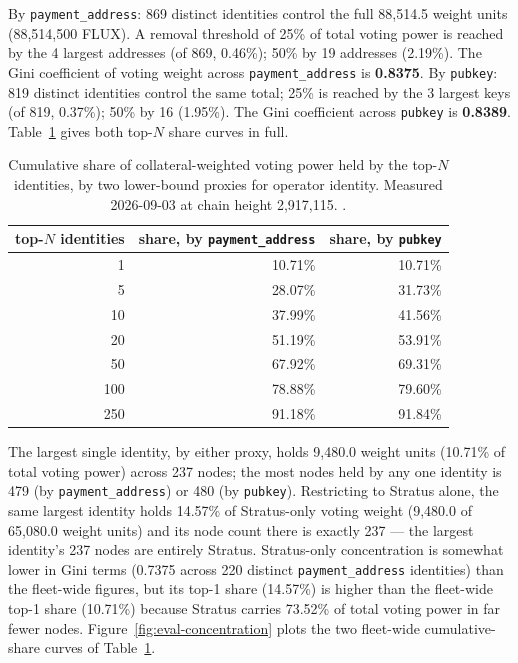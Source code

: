 By \texttt{payment\_address}: 869 distinct identities control the full 88,514.5 weight units
(88,514,500 FLUX). A removal threshold of 25\% of total voting power is reached by the 4 largest
addresses (of 869, 0.46\%); 50\% by 19 addresses (2.19\%). The Gini coefficient of voting weight
across \texttt{payment\_address} is \textbf{0.8375}. By \texttt{pubkey}: 819 distinct identities
control the same total; 25\% is reached by the 3 largest keys (of 819, 0.37\%); 50\% by 16
(1.95\%). The Gini coefficient across \texttt{pubkey} is \textbf{0.8389}. Table~\ref{tab:eval-concentration}
gives both top-$N$ share curves in full.

\begin{table}[H]
\centering
\small
\begin{tabular}{rrr}
\toprule
top-$N$ identities & share, by \texttt{payment\_address} & share, by \texttt{pubkey} \\
\midrule
1 & 10.71\% & 10.71\% \\
5 & 28.07\% & 31.73\% \\
10 & 37.99\% & 41.56\% \\
20 & 51.19\% & 53.91\% \\
50 & 67.92\% & 69.31\% \\
100 & 78.88\% & 79.60\% \\
250 & 91.18\% & 91.84\% \\
\bottomrule
\end{tabular}
\caption{Cumulative share of collateral-weighted voting power held by the top-$N$ identities, by
two lower-bound proxies for operator identity. Measured 2026-09-03 at chain height 2,917,115.
.}
\label{tab:eval-concentration}
\end{table}

The largest single identity, by either proxy, holds 9,480.0 weight units (10.71\% of total voting
power) across 237 nodes; the most nodes held by any one identity is 479 (by \texttt{payment\_address})
or 480 (by \texttt{pubkey}). Restricting to Stratus alone, the same largest identity holds 14.57\%
of Stratus-only voting weight (9,480.0 of 65,080.0 weight units) and its node count there is exactly
237 — the largest identity's 237 nodes are entirely Stratus. Stratus-only concentration is somewhat
lower in Gini terms (0.7375 across 220 distinct \texttt{payment\_address} identities) than the
fleet-wide figures, but its top-1 share (14.57\%) is higher than the fleet-wide top-1 share (10.71\%)
because Stratus carries 73.52\% of total voting power in far fewer nodes.
Figure~\ref{fig:eval-concentration} plots the two fleet-wide cumulative-share curves of
Table~\ref{tab:eval-concentration}.

